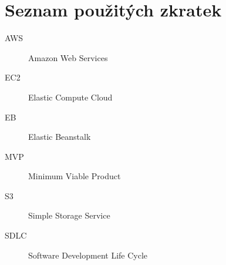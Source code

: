 \chapter{Seznam použitých zkratek}

\begin{description}
	\item[AWS] Amazon Web Services
	\item[EC2] Elastic Compute Cloud
	\item[EB] Elastic Beanstalk
	\item[MVP] Minimum Viable Product
	\item[S3] Simple Storage Service
	\item[SDLC] Software Development Life Cycle
\end{description}
	